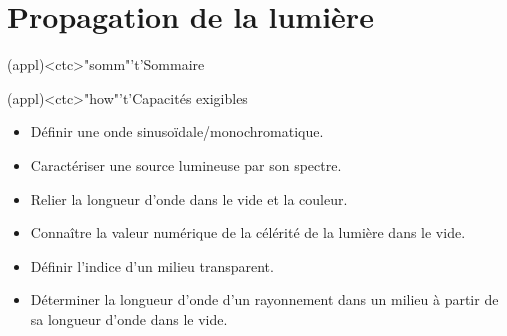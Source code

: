 \documentclass[../../main/main.tex]{subfiles}
\begin{document}
\setcounter{chapter}{0}


\chapter{Propagation de la lumi\`ere}

\vspace*{\fill}

\begin{tcn}(appl)<ctc>"somm"'t'{Sommaire}
	\let\item\olditem
	\vspace{-15pt}
	\minitoc
	\vspace{-25pt}
\end{tcn}

\begin{tcn}[sidebyside](appl)<ctc>"how"'t'{Capacités exigibles}
	\begin{itemize}[label=\rcheck]
		\item Définir une onde sinusoïdale/monochromatique.
		\item Caractériser une source lumineuse par son spectre.
		\item Relier la longueur d'onde dans le vide et la couleur.
	\end{itemize}
	\tcblower
	\begin{itemize}[label=\rcheck]
		\item Connaître la valeur numérique de la célérité de la lumière dans le
		      vide.
		\item Définir l'indice d'un milieu transparent.
		\item Déterminer la longueur d'onde d'un rayonnement dans un milieu à
		      partir de sa longueur d'onde dans le vide.
	\end{itemize}
\end{tcn}
\end{document}
